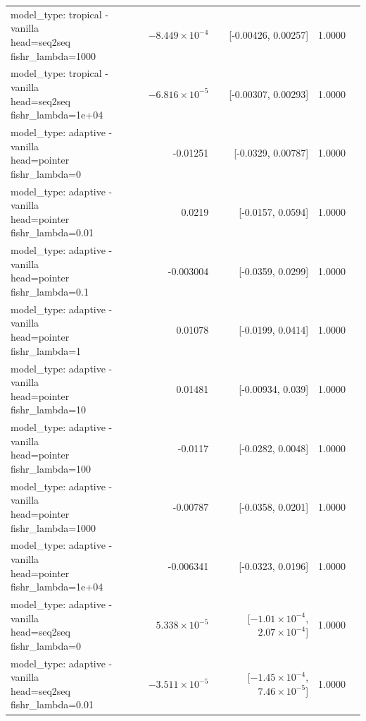 \documentclass[10pt]{article}
\makeatletter
\newcommand{\stackcell}[1]{\begin{tabular}[t]{@{}l@{}}#1\end{tabular}}
\makeatother
\begin{document}
{\begin{longtable}{lrrrl}
\stackcell{model\_type: tropical - vanilla\\\footnotesize head=seq2seq fishr\_lambda=1000 } & $-8.449\times10^{-4}$ & [-0.00426, 0.00257] & 1.0000 & \\
\stackcell{model\_type: tropical - vanilla\\\footnotesize head=seq2seq fishr\_lambda=1e+04 } & $-6.816\times10^{-5}$ & [-0.00307, 0.00293] & 1.0000 & \\
\stackcell{model\_type: adaptive - vanilla\\\footnotesize head=pointer fishr\_lambda=0 } & -0.01251 & [-0.0329, 0.00787] & 1.0000 & \\
\stackcell{model\_type: adaptive - vanilla\\\footnotesize head=pointer fishr\_lambda=0.01 } & 0.0219 & [-0.0157, 0.0594] & 1.0000 & \\
\stackcell{model\_type: adaptive - vanilla\\\footnotesize head=pointer fishr\_lambda=0.1 } & -0.003004 & [-0.0359, 0.0299] & 1.0000 & \\
\stackcell{model\_type: adaptive - vanilla\\\footnotesize head=pointer fishr\_lambda=1 } & 0.01078 & [-0.0199, 0.0414] & 1.0000 & \\
\stackcell{model\_type: adaptive - vanilla\\\footnotesize head=pointer fishr\_lambda=10 } & 0.01481 & [-0.00934, 0.039] & 1.0000 & \\
\stackcell{model\_type: adaptive - vanilla\\\footnotesize head=pointer fishr\_lambda=100 } & -0.0117 & [-0.0282, 0.0048] & 1.0000 & \\
\stackcell{model\_type: adaptive - vanilla\\\footnotesize head=pointer fishr\_lambda=1000 } & -0.00787 & [-0.0358, 0.0201] & 1.0000 & \\
\stackcell{model\_type: adaptive - vanilla\\\footnotesize head=pointer fishr\_lambda=1e+04 } & -0.006341 & [-0.0323, 0.0196] & 1.0000 & \\
\stackcell{model\_type: adaptive - vanilla\\\footnotesize head=seq2seq fishr\_lambda=0 } & $5.338\times10^{-5}$ & [$-1.01\times10^{-4}$, $2.07\times10^{-4}$] & 1.0000 & \\
\stackcell{model\_type: adaptive - vanilla\\\footnotesize head=seq2seq fishr\_lambda=0.01 } & $-3.511\times10^{-5}$ & [$-1.45\times10^{-4}$, $7.46\times10^{-5}$] & 1.0000 & \\

\end{longtable}}
\end{document}
